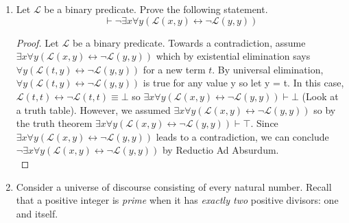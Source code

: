 \documentclass{article}
\newcommand{\lif}{\mathrel{\rightarrow}}
\newcommand{\liff}{\mathrel{\leftrightarrow}}
\newcommand{\proves}{\mathrel{\vdash}}
\begin{document}
\begin{enumerate}
\begin{enumerate}
\begin{proof}
        \end{proof}
        \item $(\varphi \lif \xi), (\psi \lif \chi), (\varphi \lor \psi) \proves \xi \lor \chi$
        \begin{proof}
        Let $\varphi$, $\psi$, $\xi$, and $\chi$ be arbitrary propositions.\\
        Assume $\varphi \lif \xi$, $\psi \lif \chi$, and $\varphi \lor \psi$.
        Assume towards a contradiction $\neg(\xi\lor\chi)$.
        Observe that by De Morgan's laws $\neg(\xi\lor\chi)\equiv\neg\xi\lor\neg\chi$ from which we can use conjunction elimination to conclude $\neg\xi$ and $\neg\chi$.
        Now, by modus tollens, we can use $\neg\xi$ and $\varphi \lif \xi$ to conclude $\neg\varphi$.
        Similarly, by modus tollens, we can use $\neg\chi$ and $\psi \lif \chi$ to conclude $\neg\psi$.
        Since we have $\neg\psi$ and $\neg\varphi$ we can use conjuction introduction to conclude $\neg\psi\land\neg\varphi$
        which is equivalent to $\neg(\varphi \lor \psi)$ by De Morgan's laws. Since we proved $\neg(\varphi \lor \psi)$ and assumed $\varphi \lor \psi$, by Reductio Ad Absurdum we can conclude $\neg(\neg(\xi\lor\chi))$ or $\xi\lor\chi$.
        \\
        \end{proof}
    \end{enumerate}
\pagebreak
    \item Let $\mathcal{L}$ be a binary predicate. Prove the following statement.
    \begin{equation*}
      \proves  \neg \exists x \forall y (\mathcal{L}(x, y) \liff \neg \mathcal{L}(y, y))
    \end{equation*}
    \begin{proof}
    Let $\mathcal{L}$ be a binary predicate. Towards a contradiction, assume $\exists x \forall y (\mathcal{L}(x, y) \liff \neg \mathcal{L}(y, y))$ which by existential elimination says $\forall y (\mathcal{L}(t, y) \liff \neg \mathcal{L}(y, y))$ for a new term $t$. By universal elimination, $\forall y (\mathcal{L}(t, y) \liff \neg \mathcal{L}(y, y))$ is true for any value y so let y = t. In this case, $\mathcal{L}(t,t) \liff \neg \mathcal{L}(t, t)\equiv\bot$ so $\exists x \forall y (\mathcal{L}(x, y) \liff \neg \mathcal{L}(y, y))\proves\bot$ (Look at a truth table). However, we assumed $\exists x \forall y (\mathcal{L}(x, y) \liff \neg \mathcal{L}(y, y))$ so by the truth theorem $\exists x \forall y (\mathcal{L}(x, y) \liff \neg \mathcal{L}(y, y))\proves\top$. Since $\exists x \forall y (\mathcal{L}(x, y) \liff \neg \mathcal{L}(y, y))$ leads to a contradiction, we can conclude $\neg\exists x \forall y (\mathcal{L}(x, y) \liff \neg \mathcal{L}(y, y))$ by Reductio Ad Absurdum.
    \\
    \end{proof} 
    \item Consider a universe of discourse consisting of every natural number.
    Recall that a positive integer is \emph{prime} when it has \emph{exactly two} positive divisors: one and itself.


\end{enumerate}
\end{document}
